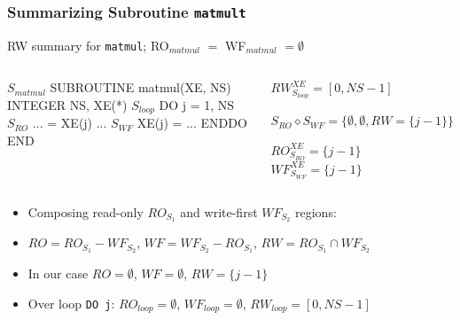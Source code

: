 \documentclass{beamer}
\renewcommand{\emph}[1]{\textcolor{structure}{#1}}
\newcommand{\emp}[1]{\textcolor{DikuRed}{ #1}}
\newcommand{\mymath}[1]{$ #1 $}
\newcommand{\myindx}[1]{_{#1}}
\newcommand{\myindu}[1]{^{#1}}
\begin{document}
\begin{frame}[fragile,t]
  \frametitle{Summarizing Subroutine {\tt matmult}}

\begin{block}{RW summary for {\tt matmul}; RO$_{matmul}$ $=$ WF$_{matmul}$ $= \emptyset$ } \vspace{-1ex}
\begin{columns} 
\begin{colorcode}[fontsize=\scriptsize]
\mymath{S\myindx{matmul}}  SUBROUTINE matmul(XE, NS)
          INTEGER NS, XE(*)
\mymath{S\myindx{loop}}       \emph{DO j = 1, NS}
\mymath{S\myindx{RO}}          \alert{...   \hspace{0.5ex}= XE(j) ...}
\mymath{S\myindx{WF}}          \alert{XE(j) = ...}
          \emph{ENDDO}
        END
\end{colorcode}
\begin{colorcode}[fontsize=\scriptsize]
\emph{\mymath{RW\myindu{XE}\myindx{S\myindx{loop}} = [0,NS-1]}}

\emp{\mymath{S\myindx{RO} \diamond S\myindx{WF} = \{\emptyset, \emptyset, RW=\{j-1\}\}}}

\alert{\mymath{RO\myindu{XE}\myindx{S\myindx{RO}} = \{j-1\}}}
\alert{\mymath{WF\myindu{XE}\myindx{S\myindx{WF}} = \{j-1\}}}
\end{colorcode}
\end{columns}
\end{block}

\bigskip

\begin{itemize}
    \item Composing read-only $RO_{S_1}$ and write-first $WF_{S_2}$ regions:  \smallskip
    \item $RO = RO_{S_1} - WF_{S_2}$, $WF = WF_{S_2} - RO_{S_1}$, $RW = RO_{S_1} \cap WF_{S_2}$  \smallskip
    \item In our case $RO = \emptyset$, $WF = \emptyset$, \emp{$RW = \{j-1\}$}  \smallskip
    \item Over loop {\tt DO j}:  $RO_{loop} = \emptyset$, $WF_{loop} = \emptyset$, \emph{$RW_{loop} = [0, NS-1]$}  \smallskip
\end{itemize}
\end{frame}



\end{document}
